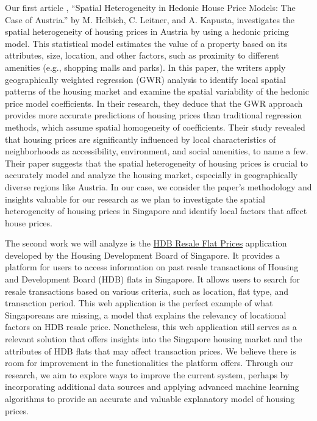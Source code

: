\documentclass[manuscript,screen]{acmart}
\begin{document}
Our first article \citep{helbich2013}, ``Spatial Heterogeneity in
Hedonic House Price Models: The Case of Austria.'' by M. Helbich, C.
Leitner, and A. Kapusta, investigates the spatial heterogeneity of
housing prices in Austria by using a hedonic pricing model. This
statistical model estimates the value of a property based on its
attributes, size, location, and other factors, such as proximity to
different amenities (e.g., shopping malls and parks). In this paper, the
writers apply geographically weighted regression (GWR) analysis to
identify local spatial patterns of the housing market and examine the
spatial variability of the hedonic price model coefficients. In their
research, they deduce that the GWR approach provides more accurate
predictions of housing prices than traditional regression methods, which
assume spatial homogeneity of coefficients. Their study revealed that
housing prices are significantly influenced by local characteristics of
neighborhoods as accessibility, environment, and social amenities, to
name a few. Their paper suggests that the spatial heterogeneity of
housing prices is crucial to accurately model and analyze the housing
market, especially in geographically diverse regions like Austria. In
our case, we consider the paper's methodology and insights valuable for
our research as we plan to investigate the spatial heterogeneity of
housing prices in Singapore and identify local factors that affect house
prices.

The second work we will analyze is the
\href{https://services2.hdb.gov.sg/webapp/BB33RTIS/}{HDB Resale Flat
Prices} \citep{HDBapp} application developed by the Housing Development
Board of Singapore. It provides a platform for users to access
information on past resale transactions of Housing and Development Board
(HDB) flats in Singapore. It allows users to search for resale
transactions based on various criteria, such as location, flat type, and
transaction period. This web application is the perfect example of what
Singaporeans are missing, a model that explains the relevancy of
locational factors on HDB resale price. Nonetheless, this web
application still serves as a relevant solution that offers insights
into the Singapore housing market and the attributes of HDB flats that
may affect transaction prices. We believe there is room for improvement
in the functionalities the platform offers. Through our research, we aim
to explore ways to improve the current system, perhaps by incorporating
additional data sources and applying advanced machine learning
algorithms to provide an accurate and valuable explanatory model of
housing prices.
\end{document}
